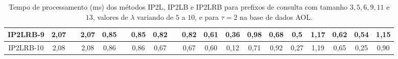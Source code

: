 \begin{table}[h]
{\begin{tabular}{c|c|c|c|c|c|c|c|c|c|c|c|c|c|c|c|c|c|c|}
\multicolumn{1}{|c|}{IP2LRB-9} & {\color[HTML]{656565} 2,07} & {\color[HTML]{656565} } & 2,07 & {\color[HTML]{656565} 0,85} & {\color[HTML]{656565} } & 0,85 & {\color[HTML]{656565} 0,82} & {\color[HTML]{656565} } & 0,82 & {\color[HTML]{656565} 0,61} & {\color[HTML]{656565} 0,36} & 0,98 & {\color[HTML]{656565} 0,68} & {\color[HTML]{656565} 0,5} & 1,17 & {\color[HTML]{656565} 0,62} & {\color[HTML]{656565} 0,54} & 1,15 \\ \hline
\multicolumn{1}{|c|}{IP2LRB-10} & {\color[HTML]{656565} 2,08} & {\color[HTML]{656565} } & 2,08 & {\color[HTML]{656565} 0,86} & {\color[HTML]{656565} } & 0,86 & {\color[HTML]{656565} 0,67} & {\color[HTML]{656565} } & 0,67 & {\color[HTML]{656565} 0,60} & {\color[HTML]{656565} 0,12} & 0,71 & {\color[HTML]{656565} 0,92} & {\color[HTML]{656565} 0,27} & 1,19 & {\color[HTML]{656565} 0,65} & {\color[HTML]{656565} 0,25} & 0,90 \\ \hline
\end{tabular}%
}
\caption{Tempo de processamento (ms) dos métodos IP2L, IP2LB e IP2LRB para prefixos de consulta com tamanho $3,5,6,9,11$ e $13$, valores de $\lambda$ variando de $5$ a $10$, e para $\tau=2$ na base de dados AOL.}
\label{tab:methods-processing-time-tau-2-AOL}
\end{table}

